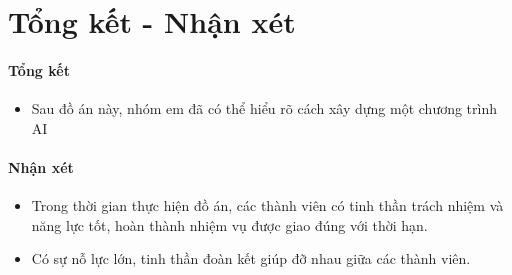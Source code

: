 \newpage
\section{Tổng kết - Nhận xét}

\paragraph{Tổng kết}
\par

\begin{itemize}
\item Sau đồ án này, nhóm em đã có thể hiểu rõ cách xây dựng một chương trình AI
\end{itemize}

\paragraph{Nhận xét}
\par

\begin{itemize}
\item Trong thời gian thực hiện đồ án, các thành viên có tinh thần trách nhiệm và năng lực tốt, hoàn thành nhiệm vụ được giao đúng với thời hạn.
\item Có sự nỗ lực lớn, tinh thần đoàn kết giúp đỡ nhau giữa các thành viên.
\end{itemize}
